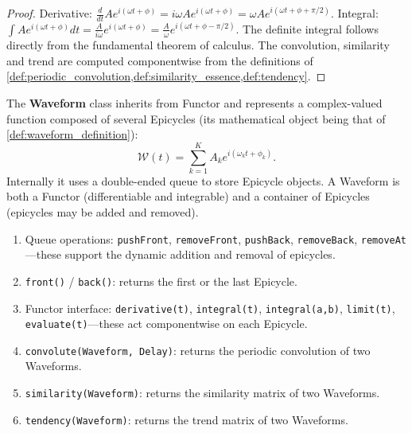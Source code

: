 \begin{proof}
Derivative: $\frac{d}{dt}Ae^{i(\omega t + \phi)} = i\omega A e^{i(\omega t + \phi)} = \omega A e^{i(\omega t + \phi + \pi/2)}$.
Integral: $\int Ae^{i(\omega t + \phi)}dt = \frac{A}{i\omega}e^{i(\omega t + \phi)} = \frac{A}{\omega}e^{i(\omega t + \phi - \pi/2)}$.
The definite integral follows directly from the fundamental theorem of calculus. The convolution, similarity and trend are computed componentwise from the definitions of \cref{def:periodic_convolution,def:similarity_essence,def:tendency}.
\end{proof}

\begin{definition}\label{def:waveform_class}
The \textbf{Waveform} class inherits from Functor and represents a complex-valued function composed of several Epicycles (its mathematical object being that of \cref{def:waveform_definition}):
\[
\mathcal{W}(t) = \sum_{k=1}^{K} A_k e^{i(\omega_k t + \phi_k)}.
\]
Internally it uses a double-ended queue to store Epicycle objects. A Waveform is both a Functor (differentiable and integrable) and a container of Epicycles (epicycles may be added and removed).
\end{definition}

\begin{property}\label{prop:waveform_class_methods}
\begin{enumerate}[label=(\roman*)]
    \item Queue operations: \texttt{pushFront}, \texttt{removeFront}, \texttt{pushBack}, \texttt{removeBack}, \texttt{removeAt}---these support the dynamic addition and removal of epicycles.
    \item \texttt{front()} / \texttt{back()}: returns the first or the last Epicycle.
    \item Functor interface: \texttt{derivative(t)}, \texttt{integral(t)}, \texttt{integral(a,b)}, \texttt{limit(t)}, \texttt{evaluate(t)}---these act componentwise on each Epicycle.
    \item \texttt{convolute(Waveform, Delay)}: returns the periodic convolution of two Waveforms.
    \item \texttt{similarity(Waveform)}: returns the similarity matrix of two Waveforms.
    \item \texttt{tendency(Waveform)}: returns the trend matrix of two Waveforms.
\end{enumerate}
\end{property}


